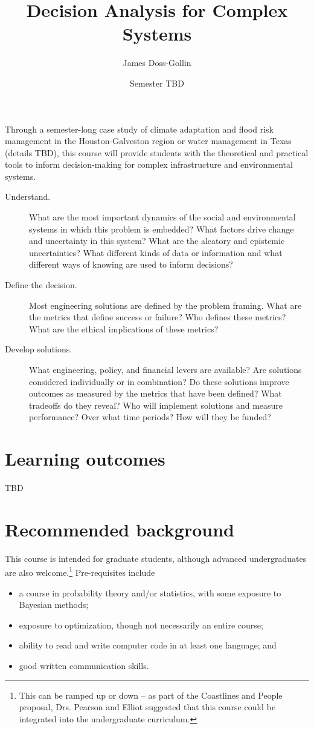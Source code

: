 \documentclass[nobib]{tufte-handout}
\title{Decision Analysis for Complex Systems}
\author{James Doss-Gollin}
\date{Semester TBD}
\begin{document}
\maketitle

Through a semester-long case study of climate adaptation and flood risk management in the Houston-Galveston region or water management in Texas (details TBD), this course will provide students with the theoretical and practical tools to inform decision-making for complex infrastructure and environmental systems.
\begin{description}
	\item[Understand.] What are the most important dynamics of the social and environmental systems in which this problem is embedded? What factors drive change and uncertainty in this system? What are the aleatory and epistemic uncertainties? What different kinds of data or information and what different ways of knowing are used to inform decisions?
	\item[Define the decision.] Most engineering solutions are defined by the problem framing.  What are the metrics that define success or failure? Who defines these metrics? What are the ethical implications of these metrics?
	\item[Develop solutions.] What engineering, policy, and financial levers are available? Are solutions considered individually or in combination? Do these solutions improve outcomes as measured by the metrics that have been defined? What tradeoffs do they reveal? Who will implement solutions and measure performance? Over what time periods? How will they be funded?
\end{description}

\section{Learning outcomes}

TBD

\section{Recommended background}

This course is intended for graduate students, although advanced undergraduates are also welcome.\footnote{This can be ramped up or down -- as part of the Coastlines and People proposal, Drs. Pearson and Elliot suggested that this course could be integrated into the undergraduate curriculum.}
Pre-requisites include
\begin{itemize}
	\item a course in probability theory and/or statistics, with some exposure to Bayesian methods;
	\item exposure to optimization, though not necessarily an entire course;
	\item ability to read and write computer code in at least one language; and
	\item good written communication skills.
\end{itemize}
\end{document}
